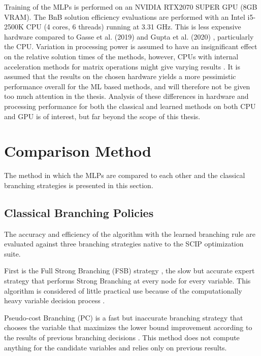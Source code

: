 Training of the \gls{MLP}s is performed on an NVIDIA RTX2070 SUPER GPU (8GB VRAM). The \gls{BnB} solution efficiency evaluations are performed with an Intel i5-2500K \gls{CPU} (4 cores, 6 threads) running at 3.31 GHz. This is less expensive hardware compared to Gasse et al. (2019) \cite{gasse2019exact} and Gupta et al. (2020) \cite{gupta2020hybrid}, particularly the CPU. Variation in processing power is assumed to have an insignificant effect on the relative solution times of the methods, however, \gls{CPU}s with internal acceleration methods for matrix operations might give varying results \cite{vanhoucke2011improving}. It is assumed that the results on the chosen hardware yields a more pessimistic performance overall for the \gls{ML} based methods, and will therefore not be given too much attention in the thesis. Analysis of these differences in hardware and processing performance for both the classical and learned methods on both \gls{CPU} and \gls{GPU} is of interest, but far beyond the scope of this thesis. 



\section{Comparison Method}

The method in which the \gls{MLP}s are compared to each other and the classical branching strategies is presented in this section.


\subsection{Classical Branching Policies}

The accuracy and efficiency of the algorithm with the learned branching rule are evaluated against three branching strategies native to the \gls{SCIP} optimization suite. 

First is the Full Strong Branching (\gls{FSB}) strategy \cite{applegate1995finding}, the slow but accurate expert strategy that performs Strong Branching at every node for every variable. This algorithm is considered of little practical use because of the computationally heavy variable decision process \cite{achterberg2004branching}.

Pseudo-cost Branching (\gls{PC}) is a fast but inaccurate branching strategy \cite{gamrath2018measuring} that chooses the variable that maximizes the lower bound improvement according to the results of previous branching decisions \cite{benchiou1971experiments}. This method does not compute anything for the candidate variables and relies only on previous results. 

